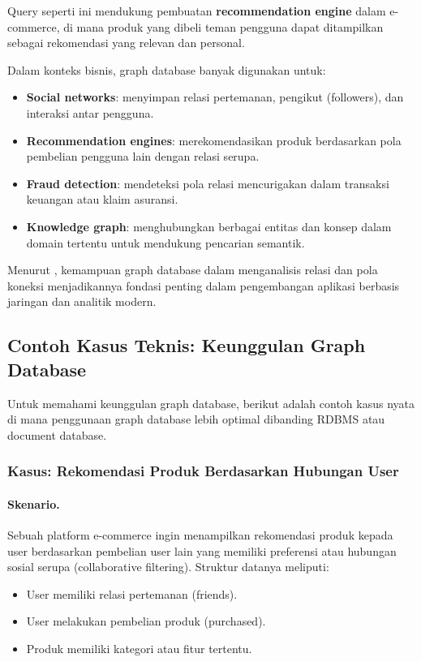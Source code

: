 Query seperti ini mendukung pembuatan \textbf{recommendation engine} dalam e-commerce, di mana produk yang dibeli teman pengguna dapat ditampilkan sebagai rekomendasi yang relevan dan personal.



Dalam konteks bisnis, graph database banyak digunakan untuk:
\begin{itemize}
	\item \textbf{Social networks}: menyimpan relasi pertemanan, pengikut (followers), dan interaksi antar pengguna.
	\item \textbf{Recommendation engines}: merekomendasikan produk berdasarkan pola pembelian pengguna lain dengan relasi serupa.
	\item \textbf{Fraud detection}: mendeteksi pola relasi mencurigakan dalam transaksi keuangan atau klaim asuransi.
	\item \textbf{Knowledge graph}: menghubungkan berbagai entitas dan konsep dalam domain tertentu untuk mendukung pencarian semantik.
\end{itemize}

Menurut \cite{gandomi2015}, kemampuan graph database dalam menganalisis relasi dan pola koneksi menjadikannya fondasi penting dalam pengembangan aplikasi berbasis jaringan dan analitik modern.


\subsection{Contoh Kasus Teknis: Keunggulan Graph Database}

Untuk memahami keunggulan graph database, berikut adalah contoh kasus nyata di mana penggunaan graph database lebih optimal dibanding RDBMS atau document database.

\subsubsection{Kasus: Rekomendasi Produk Berdasarkan Hubungan User}

\paragraph{Skenario.}

Sebuah platform e-commerce ingin menampilkan rekomendasi produk kepada user berdasarkan pembelian user lain yang memiliki preferensi atau hubungan sosial serupa (collaborative filtering). Struktur datanya meliputi:
\begin{itemize}
	\item User memiliki relasi pertemanan (friends).
	\item User melakukan pembelian produk (purchased).
	\item Produk memiliki kategori atau fitur tertentu.
\end{itemize}

